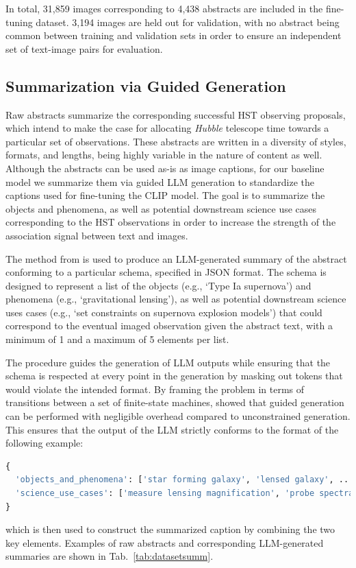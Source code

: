 \documentclass[10pt]{article} %
\newcommand{\hubble}{\emph{Hubble}\xspace}
\begin{document}
In total, 31,859 images corresponding to 4,438 abstracts are included in the fine-tuning dataset. 3,194 images are held out for validation, with no abstract being common between training and validation sets in order to ensure an independent set of text-image pairs for evaluation.


\subsection{Summarization via Guided Generation}
\label{sec:summarization}

Raw abstracts summarize the corresponding successful HST observing proposals, which intend to make the case for allocating \hubble telescope time towards a particular set of observations. These abstracts are written in a diversity of styles, formats, and lengths, being highly variable in the nature of content as well. Although the abstracts can be used as-is as image captions, for our baseline model we summarize them via guided LLM generation to standardize the captions used for fine-tuning the CLIP model. The goal is to summarize the objects and phenomena, as well as potential downstream science use cases corresponding to the HST observations in order to increase the strength of the association signal between text and images.

The method from \cite{willard2023efficient} is used to produce an LLM-generated summary of the abstract conforming to a particular schema, specified in JSON format. The schema is designed to represent a list of the objects (e.g., `Type Ia supernova') and phenomena (e.g., `gravitational lensing'), as well as potential downstream science uses cases (e.g., `set constraints on supernova explosion models') that could correspond to the eventual imaged observation given the abstract text, with a minimum of 1 and a maximum of 5 elements per list.

The procedure guides the generation of LLM outputs while ensuring that the schema is respected at every point in the generation by masking out tokens that would violate the intended format. By framing the problem in terms of transitions between a set of finite-state machines, \cite{willard2023efficient} showed that guided generation can be performed with negligible overhead compared to unconstrained generation. This ensures that the output of the LLM strictly conforms to the format of the following example:
\begin{lstlisting}[language=Python]
{
  'objects_and_phenomena': ['star forming galaxy', 'lensed galaxy', ...], 
  'science_use_cases': ['measure lensing magnification', 'probe spectral energy distributions', ...]
}
\end{lstlisting}
which is then used to construct the summarized caption by combining the two key elements. Examples of raw abstracts and corresponding LLM-generated summaries are shown in Tab.~\ref{tab:datasetsumm}.
\end{document}
